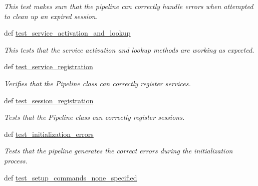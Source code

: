 \begin{DoxyCompactItemize}
\begin{DoxyCompactList}\small\item\em This test makes sure that the pipeline can correctly handle errors when attempted to clean up an expired session. \end{DoxyCompactList}\item 
def \hyperlink{classhwm_1_1hardware_1_1pipelines_1_1tests_1_1test__pipeline_1_1_test_pipeline_a48c55d273d6e3520508fcec0c42f7517}{test\-\_\-service\-\_\-activation\-\_\-and\-\_\-lookup}
\begin{DoxyCompactList}\small\item\em This tests that the service activation and lookup methods are working as expected. \end{DoxyCompactList}\item 
def \hyperlink{classhwm_1_1hardware_1_1pipelines_1_1tests_1_1test__pipeline_1_1_test_pipeline_a2a1f139140dcaa5c9416c961c6729d71}{test\-\_\-service\-\_\-registration}
\begin{DoxyCompactList}\small\item\em Verifies that the Pipeline class can correctly register services. \end{DoxyCompactList}\item 
def \hyperlink{classhwm_1_1hardware_1_1pipelines_1_1tests_1_1test__pipeline_1_1_test_pipeline_a6e97f0356d167c151d95577683e8ad01}{test\-\_\-session\-\_\-registration}
\begin{DoxyCompactList}\small\item\em Tests that the Pipeline class can correctly register sessions. \end{DoxyCompactList}\item 
\hypertarget{classhwm_1_1hardware_1_1pipelines_1_1tests_1_1test__pipeline_1_1_test_pipeline_a569fcc0a744cd01148343c99da35307c}{def \hyperlink{classhwm_1_1hardware_1_1pipelines_1_1tests_1_1test__pipeline_1_1_test_pipeline_a569fcc0a744cd01148343c99da35307c}{test\-\_\-initialization\-\_\-errors}}\label{classhwm_1_1hardware_1_1pipelines_1_1tests_1_1test__pipeline_1_1_test_pipeline_a569fcc0a744cd01148343c99da35307c}

\begin{DoxyCompactList}\small\item\em Tests that the pipeline generates the correct errors during the initialization process. \end{DoxyCompactList}\item 
\hypertarget{classhwm_1_1hardware_1_1pipelines_1_1tests_1_1test__pipeline_1_1_test_pipeline_a8c58cb4f65e0ba4ebfaa4c38046fe6c3}{def \hyperlink{classhwm_1_1hardware_1_1pipelines_1_1tests_1_1test__pipeline_1_1_test_pipeline_a8c58cb4f65e0ba4ebfaa4c38046fe6c3}{test\-\_\-setup\-\_\-commands\-\_\-none\-\_\-specified}}\label{classhwm_1_1hardware_1_1pipelines_1_1tests_1_1test__pipeline_1_1_test_pipeline_a8c58cb4f65e0ba4ebfaa4c38046fe6c3}


\end{DoxyCompactItemize}
